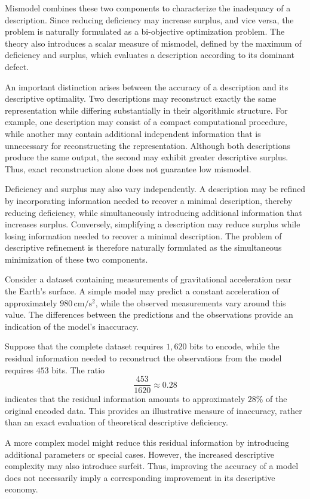 Mismodel combines these two components to characterize the inadequacy of a description. Since reducing deficiency may increase surplus, and vice versa, the problem is naturally formulated as a bi-objective optimization problem. The theory also introduces a scalar measure of mismodel, defined by the maximum of deficiency and surplus, which evaluates a description according to its dominant defect.

An important distinction arises between the accuracy of a description and its descriptive optimality. Two descriptions may reconstruct exactly the same representation while differing substantially in their algorithmic structure. For example, one description may consist of a compact computational procedure, while another may contain additional independent information that is unnecessary for reconstructing the representation. Although both descriptions produce the same output, the second may exhibit greater descriptive surplus. Thus, exact reconstruction alone does not guarantee low mismodel.

Deficiency and surplus may also vary independently. A description may be refined by incorporating information needed to recover a minimal description, thereby reducing deficiency, while simultaneously introducing additional information that increases surplus. Conversely, simplifying a description may reduce surplus while losing information needed to recover a minimal description. The problem of descriptive refinement is therefore naturally formulated as the simultaneous minimization of these two components.

\begin{example}
\label{ex:introduction:mismodel:newton}
Consider a dataset containing measurements of gravitational acceleration near the Earth's surface. A simple model may predict a constant acceleration of approximately $980\,\mathrm{cm/s^2}$, while the observed measurements vary around this value. The differences between the predictions and the observations provide an indication of the model's inaccuracy.

Suppose that the complete dataset requires $1,620$ bits to encode, while the residual information needed to reconstruct the observations from the model requires $453$ bits. The ratio
\[
\frac{453}{1620}\approx 0.28
\]
indicates that the residual information amounts to approximately $28\%$ of the original encoded data. This provides an illustrative measure of inaccuracy, rather than an exact evaluation of theoretical descriptive deficiency.

A more complex model might reduce this residual information by introducing additional parameters or special cases. However, the increased descriptive complexity may also introduce surfeit. Thus, improving the accuracy of a model does not necessarily imply a corresponding improvement in its descriptive economy.
\end{example}

